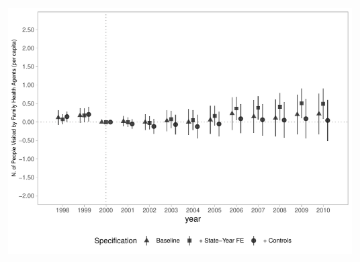 \begin{figure}[h]
\begin{center}
\begin{subfigure}{0.32\textwidth}
        \includegraphics[width=\textwidth]{plots/access/siab_accomp_especif_psf_pcapita_dist_ec29_baseline_dist_ec29_baseline_full.pdf}
    \end{subfigure}
    
    
    \end{center}
    
\end{figure}

